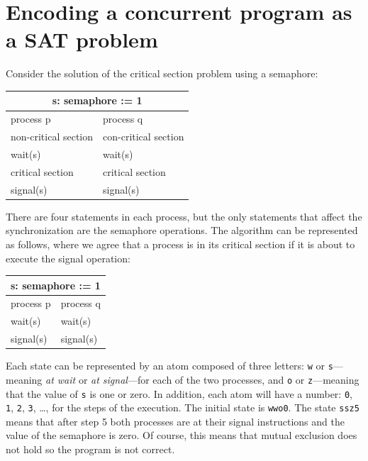 \documentclass[11pt]{report}
\newcommand*{\p}[1]{\textup{\texttt{#1}}}
\begin{document}
\newpage


\section{Encoding a concurrent program as a SAT problem}

Consider the solution of the critical section problem using a semaphore:

\begin{center}
\begin{tabular}{|l|l|}
\hline
\multicolumn{2}{|c|}{s: semaphore := 1}\\\hline
process p & process q\\\hline
non-critical section & con-critical section \\
wait(s) & wait(s) \\
critical section & critical section \\
signal(s) & signal(s)\\\hline
\end{tabular}
\end{center}

There are four statements in each process, but the only statements that
affect the synchronization are the semaphore operations. The algorithm
can be represented as follows, where we agree that a process is in its
critical section if it is about to execute the signal operation:

\begin{center}
\begin{tabular}{|l|l|}
\hline
\multicolumn{2}{|c|}{s: semaphore := 1}\\\hline
process p & process q\\\hline
wait(s) & wait(s) \\
signal(s) & signal(s)\\\hline
\end{tabular}
\end{center}

Each state can be represented by an atom composed of three letters:
\p{w} or \p{s}---meaning \emph{at wait} or \emph{at signal}---for each
of the two processes, and \p{o} or \p{z}---meaning that the value of
\p{s} is one or zero. In addition, each atom will have a number: \p{0},
\p{1}, \p{2}, \p{3}, \ldots, for the steps of the execution. The initial
state is \p{wwo0}. The state \p{ssz5} means that after step 5 both
processes are at their signal instructions and the value of the
semaphore is zero. Of course, this means that mutual exclusion does
not hold so the program is not correct.
\end{document}
